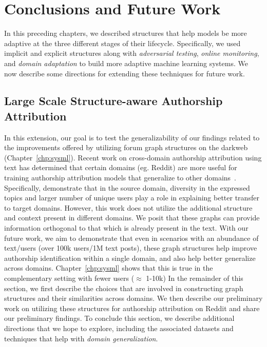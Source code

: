 \chapter{Conclusions and Future Work}
\label{chp:future_work}

In this preceding chapters, we described structures that help models be more adaptive at the three different stages of their lifecycle.
Specifically, we used implicit and explicit structures along with \textit{adversarial testing}, \textit{online monitoring}, and \textit{domain adaptation} to build more adaptive machine learning systems.
We now describe some directions for extending these techniques for future work.


\section{Large Scale Structure-aware Authorship Attribution}
\label{sec:future_work:scale}
In this extension, our goal is to test the generalizability of our findings related to the improvements offered by utilizing forum graph structures on the darkweb (Chapter~\ref{chp:sysml}).
Recent work on cross-domain authorship attribution using text has determined that certain domains (eg. Reddit) are more useful for training authorship attribution models that generalize to other domains~\cite{barlas2020cross,riverastao2021learning}.
Specifically, \citet{riverastao2021learning} demonstrate that in the source domain, diversity in the expressed topics and larger number of unique users play a role in explaining better transfer to target domains.
However, this work does not utilize the additional structure and context present in different domains.
We posit that these graphs can provide information orthogonal to that which is already present in the text.
 With our future work, we aim to demonstrate that even in scenarios with an abundance of text/users (over 100k users/1M text posts), these graph structures help improve authorship identification within a single domain, and also help better generalize across domains.
 Chapter~\ref{chp:sysml} shows that this is true in the complementary setting with fewer users ($\approx$ 1-10k)
In the remainder of this section, we first describe the choices that are involved in constructing graph structures and their similarities across domains. 
We then describe our preliminary work on utilizing these structures for authorship attribution on Reddit and share our preliminary findings.
To conclude this section, we describe additional directions that we hope to explore, including the associated datasets and techniques that help with \textit{domain generalization}.

